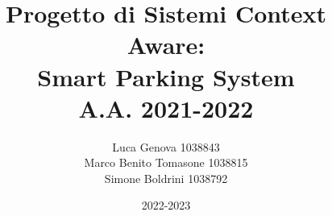 \documentclass[12pt, a4paper]{report}
\author{Luca Genova  1038843\\ 
        Marco Benito Tomasone 1038815\\
        Simone Boldrini 1038792\\}
\date{2022-2023}
\title{Progetto di Sistemi Context Aware:\\
       Smart Parking System\\
       A.A. 2021-2022}
\begin{document}
\maketitle
\tableofcontents









\nocite{*}
\end{document}
